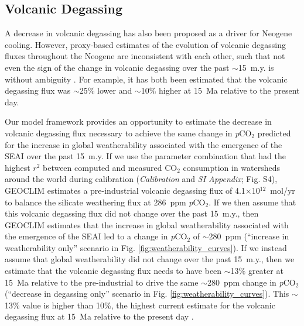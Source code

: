 \documentclass[9pt,twocolumn,twoside,lineno]{pnas-new}
\newcommand{\pCOtwo}{\textit{p}CO$_{2}$\xspace}
\newcommand{\COtwo}{CO$_{2}$\xspace}
\newcommand{\SI}{\textit{SI Appendix}\xspace}
\begin{document}
\subsection*{Volcanic Degassing}

A decrease in volcanic degassing \cite{Berner1983a} has also been proposed as a driver for Neogene cooling. However, proxy-based estimates of the evolution of volcanic degassing fluxes throughout the Neogene are inconsistent with each other, such that not even the sign of the change in volcanic degassing over the past $\sim$15~m.y. is without ambiguity \cite{Godderis2017c}. For example, it has both been estimated that the volcanic degassing flux was $\sim$25\% lower \cite{Cogne2006a} and $\sim$10\% higher \cite{Van-Der-Meer2014a} at 15~Ma relative to the present day.

Our model framework provides an opportunity to estimate the decrease in volcanic degassing flux necessary to achieve the same change in \pCOtwo predicted for the increase in global weatherability associated with the emergence of the SEAI over the past 15~m.y. If we use the parameter combination that had the highest $r^{2}$ between computed and measured \COtwo consumption in watersheds around the world during calibration (\textit{Calibration} and \SI; Fig. S4), GEOCLIM estimates a pre-industrial volcanic degassing flux of 4.1$\times$10$^{12}$~mol/yr to balance the silicate weathering flux at 286~ppm \pCOtwo. If we then assume that this volcanic degassing flux did not change over the past 15~m.y., then GEOCLIM estimates that the increase in global weatherability associated with the emergence of the SEAI led to a change in \pCOtwo of $\sim$280~ppm (``increase in weatherability only'' scenario in Fig. \ref{fig:weatherability_curves}). If we instead assume that global weatherability did not change over the past 15~m.y., then we estimate that the volcanic degassing flux needs to have been $\sim$13\% greater at 15~Ma relative to the pre-industrial to drive the same $\sim$280~ppm change in \pCOtwo (``decrease in degassing only'' scenario in Fig. \ref{fig:weatherability_curves}). This $\sim$13\% value is higher than 10\%, the highest current estimate for the volcanic degassing flux at 15~Ma relative to the present day \cite{Van-Der-Meer2014a}.
\end{document}

